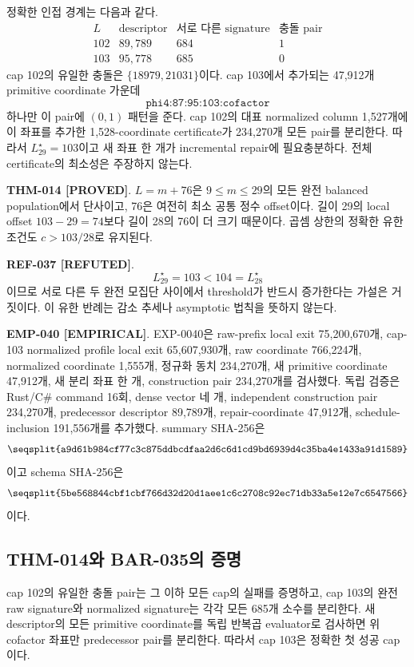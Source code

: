 \documentclass[11pt]{article}
\newcommand{\claimstatus}[2]{\textbf{#1 [#2]}}
\begin{document}
정확한 인접 경계는 다음과 같다.
\[
\begin{array}{c|r|r|r}
L&\text{descriptor}&\text{서로 다른 signature}&\text{충돌 pair}\\
\hline
102&89{,}789&684&1\\
103&95{,}778&685&0
\end{array}
\]
cap 102의 유일한 충돌은 \(\{18979,21031\}\)이다. cap 103에서
추가되는 47,912개 primitive coordinate 가운데
\[
\texttt{phi4:87:95:103:cofactor}
\]
하나만 이 pair에 \((0,1)\) 패턴을 준다. cap 102의 대표 normalized
column 1,527개에 이 좌표를 추가한 1,528-coordinate certificate가
234,270개 모든 pair를 분리한다. 따라서
\(L_{29}^{\star}=103\)이고 새 좌표 한 개가 incremental repair에
필요충분하다. 전체 certificate의 최소성은 주장하지 않는다.

\claimstatus{THM-014}{PROVED}.
\(L=m+76\)은 \(9\le m\le29\)의 모든 완전 balanced population에서
단사이고, 76은 여전히 최소 공통 정수 offset이다. 길이 29의 local
offset \(103-29=74\)보다 길이 28의 76이 더 크기 때문이다. 곱셈
상한의 정확한 유한 조건도 \(c>103/28\)로 유지된다.

\claimstatus{REF-037}{REFUTED}.
\[
L_{29}^{\star}=103<104=L_{28}^{\star}
\]
이므로 서로 다른 두 완전 모집단 사이에서 threshold가 반드시
증가한다는 가설은 거짓이다. 이 유한 반례는 감소 추세나 asymptotic
법칙을 뜻하지 않는다.

\claimstatus{EMP-040}{EMPIRICAL}.
EXP-0040은 raw-prefix local exit 75,200,670개, cap-103 normalized
profile local exit 65,607,930개, raw coordinate 766,224개, normalized
coordinate 1,555개, 정규화 동치 234,270개, 새 primitive coordinate
47,912개, 새 분리 좌표 한 개, construction pair 234,270개를
검사했다. 독립 검증은 Rust/C\# command 16회, dense vector 네 개,
independent construction pair 234,270개, predecessor descriptor
89,789개, repair-coordinate 47,912개, schedule-inclusion 191,556개를
추가했다. summary SHA-256은
\[
\texttt{\seqsplit{a9d61b984cf77c3c875ddbcdfaa2d6c6d1cd9bd6939d4c35ba4e1433a91d1589}}
\]
이고 schema SHA-256은
\[
\texttt{\seqsplit{5be568844cbf1cbf766d32d20d1aee1c6c2708c92ec71db33a5e12e7c6547566}}
\]
이다.

\subsection{THM-014와 BAR-035의 증명}

cap 102의 유일한 충돌 pair는 그 이하 모든 cap의 실패를 증명하고,
cap 103의 완전 raw signature와 normalized signature는 각각 모든
685개 소수를 분리한다. 새 descriptor의 모든 primitive coordinate를
독립 반복곱 evaluator로 검사하면 위 cofactor 좌표만 predecessor
pair를 분리한다. 따라서 cap 103은 정확한 첫 성공 cap이다.
\end{document}
